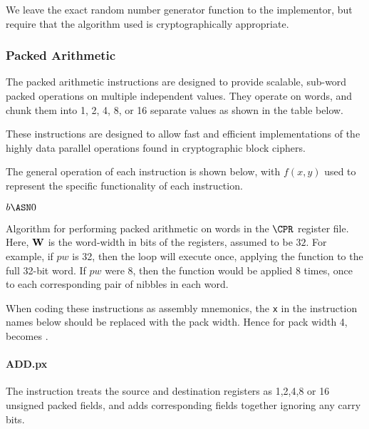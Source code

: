 We leave the exact random number generator function to the implementor,
but require that the algorithm used is cryptographically appropriate.

\subsubsection{Packed Arithmetic}

The packed arithmetic instructions are designed to provide scalable, sub-word
packed operations on multiple independent values. They operate on words, and
chunk them into 1, 2, 4, 8, or 16 separate values as shown in the table
below.

These instructions are designed to allow fast and efficient implementations
of the highly data parallel operations found in cryptographic block ciphers.

The general operation of each instruction is shown below, with $f(x,y)$
used to represent the specific functionality of each instruction.

\medskip

\begin{algorithm}[H]
    $b   \ASN 0 $\;
\caption{Algorithm for performing packed arithmetic on words in the 
$\CPR$ register file. Here, ${\bf W}$ is the word-width in bits of the
registers, assumed to be $32$. For example, if $pw$ is 32, then the loop
will execute once, applying the function to the full 32-bit word. If $pw$
were $8$, then the function would be applied $8$ times, once to each
corresponding pair of nibbles in each word.}
\end{algorithm}

When coding these instructions as assembly mnemonics, the {\tt x} in the
instruction names below should be replaced with the pack width. Hence
for pack width 4,  becomes .

\paragraph{ADD.px}

The instruction  treats the source and destination registers as
1,2,4,8 or 16 unsigned packed fields, and adds corresponding fields
together ignoring any carry bits.


